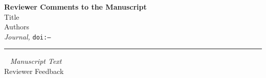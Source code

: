 \providecommand{\lettertitle}{Reviewer Comments to the Manuscript}
\providecommand{\papertitle}{Title}
\providecommand{\authors}{Authors}
\providecommand{\journal}{Journal}
\providecommand{\doi}{--}


\usepackage[hidelinks]{hyperref}




{\Large\bf \lettertitle}\\[1em]
{\huge \papertitle}\\[1em]
{\authors}\\
{\it \journal, }\texttt{doi:\doi}\\
\hrule

\begin{flushright}
\vspace{-1em}
\vline ~ \emph{Manuscript Text} \\
Reviewer Feedback \\
\end{flushright}
